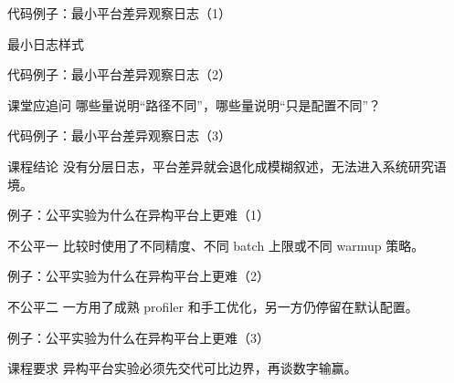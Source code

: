 \begin{frame}{代码例子：最小平台差异观察日志（1）}
\begin{block}{最小日志样式}
    {\ttfamily\small
    \par
    \par
    }
  \end{block}
\end{frame}

\begin{frame}{代码例子：最小平台差异观察日志（2）}
\begin{block}{课堂应追问}
    哪些量说明“路径不同”，哪些量说明“只是配置不同”？
  \end{block}
\end{frame}

\begin{frame}{代码例子：最小平台差异观察日志（3）}
\begin{block}{课程结论}
    没有分层日志，平台差异就会退化成模糊叙述，无法进入系统研究语境。
  \end{block}
\end{frame}

\begin{frame}{例子：公平实验为什么在异构平台上更难（1）}
\begin{block}{不公平一}
    比较时使用了不同精度、不同 batch 上限或不同 warmup 策略。
  \end{block}
\end{frame}

\begin{frame}{例子：公平实验为什么在异构平台上更难（2）}
\begin{block}{不公平二}
    一方用了成熟 profiler 和手工优化，另一方仍停留在默认配置。
  \end{block}
\end{frame}

\begin{frame}{例子：公平实验为什么在异构平台上更难（3）}
\begin{block}{课程要求}
    异构平台实验必须先交代可比边界，再谈数字输赢。
  \end{block}
\end{frame}

